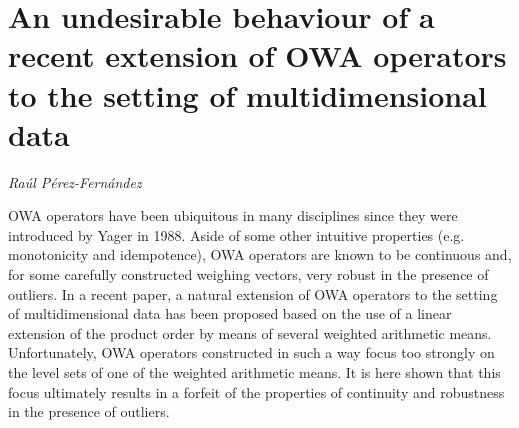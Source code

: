 \documentclass[../booklet.tex]{subfiles}
\begin{document}
\section[An undesirable behaviour of a recent extension of OWA operators to the setting of multidimensional data. {\it Raúl Pérez-Fernández}]{An undesirable behaviour of a recent extension of OWA operators to the setting of multidimensional data}

\begin{center}
  {\it Raúl Pérez-Fernández}
\end{center}

\vskip 0.8cm


OWA operators have been ubiquitous in many disciplines since they were introduced by Yager in 1988. Aside of some other intuitive properties (e.g. monotonicity and idempotence), OWA operators are known to be continuous and, for some carefully constructed weighing vectors, very robust in the presence of outliers. In a recent paper, a natural extension of OWA operators to the setting of multidimensional data has been proposed based on the use of a linear extension of the product order by means of several weighted arithmetic means. Unfortunately, OWA operators constructed in such a way focus too strongly on the level sets of one of the weighted arithmetic means. It is here shown that this focus ultimately results in a forfeit of the properties of continuity and robustness in the presence of outliers. 

\end{document}
